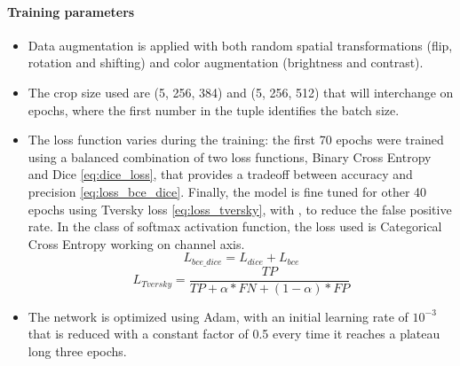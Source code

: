 \documentclass[10pt,twocolumn,letterpaper]{article}
\begin{document}
      \paragraph{Training parameters}
         \begin{itemize}
            \item Data augmentation is applied with both random spatial transformations (flip, rotation and shifting) and color augmentation (brightness and contrast).
            \item The crop size used are (5, 256, 384) and (5, 256, 512) that will interchange on epochs, where the first number in the tuple identifies the batch size.
            \item The loss function varies during the training: the first 70 epochs were trained using a balanced combination of two loss functions, Binary Cross Entropy and Dice \eqref{eq:dice_loss}, that provides a tradeoff between accuracy and precision \eqref{eq:loss_bce_dice}. Finally, the model is fine tuned for other 40 epochs using Tversky loss \eqref{eq:loss_tversky}, \cite{tversky} with , to reduce the false positive rate. In the class of softmax activation function, the loss used is Categorical Cross Entropy working on channel axis.
            \begin{equation}\label{eq:loss_bce_dice}
               L_{bce\_dice} = L_{dice} + L_{bce}
            \end{equation}
            \begin{equation}\label{eq:loss_tversky}
               L_{Tversky} = \frac{TP}{TP + \alpha*FN + (1-\alpha)*FP}
            \end{equation}
            \item The network is optimized using Adam, with an initial learning rate of $ 10^{-3} $ that is reduced with a constant factor of 0.5 every time it reaches a plateau long three epochs.
         \end{itemize}
\end{document}
